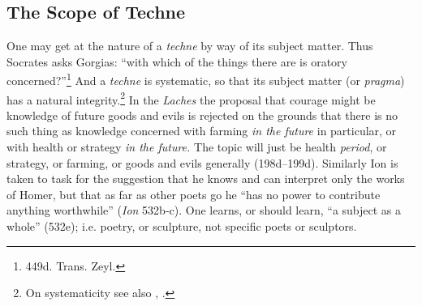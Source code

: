 ﻿\documentclass[11pt]{amsart}
\begin{document}



\subsection{The Scope of Techne}

One may get at the nature of a \emph{techne} by way of its subject matter. Thus Socrates asks Gorgias: ``with which of the things there are is oratory concerned?''\footnote{449d. Trans. Zeyl.} And a \emph{techne} is systematic, so that its subject matter (or \emph{pragma}) has a natural integrity.\footnote{On systematicity see also \citet[71--2]{woodruff1990pse}, \citet[135--6]{asmith1998}.} In the \emph{Laches} the proposal that courage might be knowledge of future goods and evils is rejected on the grounds that there is no such thing as knowledge concerned with farming \emph{in the future} in particular, or with health or strategy \emph{in the future.} The topic will just be health \emph{period}, or strategy, or farming, or goods and evils generally (198d--199d). Similarly Ion is taken to task for the suggestion that he knows and can interpret only the works of Homer, but that as far as other poets go he ``has no power to contribute anything worthwhile'' (\emph{Ion} 532b-c). One learns, or should learn, ``a subject as a whole'' (532e); i.e. poetry, or sculpture, not specific poets or sculptors.






\end{document}
